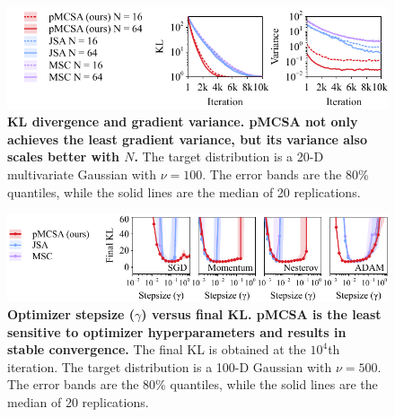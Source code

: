 

\begin{figure}
  \vspace{-0.27in}
  \centering
  \includegraphics[scale=1.0]{figures/gaussian_02.pdf}
  \vspace{-0.08in}
  \caption{\textbf{
      KL divergence and gradient variance.
      pMCSA not only achieves the least gradient variance, but its variance also scales better with \(N\).
    }
    The target distribution is a 20-D multivariate Gaussian with \(\nu = 100\).
    The error bands are the 80\% quantiles, while the solid lines are the median of 20 replications.
  }\label{fig:gaussian}
\end{figure}
\begin{figure}
  \vspace{-0.15in}
  \centering
  \includegraphics[scale=1.0]{figures/stepsize_02.pdf}
  \vspace{-0.05in}
  \caption{\textbf{Optimizer stepsize (\(\gamma\)) versus final KL.
      pMCSA is the least sensitive to optimizer hyperparameters and results in stable convergence.}
      The final KL is obtained at the \(10^4\)th iteration.
      The target distribution is a 100-D Gaussian with \(\nu = 500\).
      The error bands are the 80\% quantiles, while the solid lines are the median of 20 replications.
  }\label{fig:stepsize}
  \vspace{-0.2in}
\end{figure}

